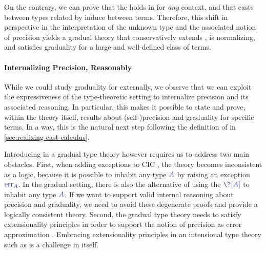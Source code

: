 On the contrary, we can prove that the  holds in 
for \emph{any}  context, and that casts between types related by
 induce  between  terms.
%
Therefore, this shift in perspective in the interpretation of the unknown type and
the associated notion of precision yields a gradual theory
that conservatively extends , is normalizing,
and satisfies graduality for a large and well-defined class of terms.

\paragraph{Internalizing Precision, Reasonably}
While we could study graduality for  externally,
we observe that we can exploit the expressiveness of the type-theoretic setting to
internalize precision and its associated reasoning.
In particular, this makes it possible to state and prove, within the theory itself,
results about (self-)precision and graduality for specific terms.
In a way, this is the natural next step following the definition of
 in \cref{sec:realizing-cast-calculus}.

Introducing  in a gradual type theory however
requires us to address two main obstacles.
First, when adding exceptions to CIC , 
the theory becomes inconsistent as a logic,
because it is possible to inhabit any type $\tcol{A}$ by raising an
exception $\tcol{\err[A]}$.
In the gradual setting, there is also the alternative of using the 
$\tcol{\?[A]}$ to inhabit any type $\tcol{A}$.
If we want to support valid internal reasoning about precision and graduality,
we need to avoid these degenerate proofs and provide a logically consistent theory.
Second, the gradual type theory needs to satisfy extensionality principles in order to support 
the notion of precision as error approximation . 
Embracing extensionality principles in an intensional type theory such as 
is a challenge in itself.

